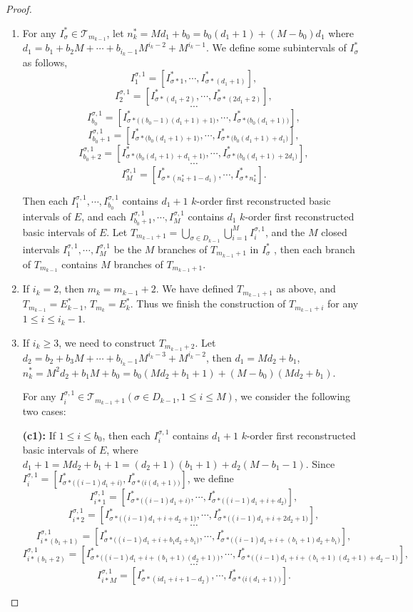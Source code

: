 \documentclass[reqno]{amsart}
\theoremstyle{plain}
\theoremstyle{definition}
\theoremstyle{remark}
\numberwithin{equation}{section} \DeclareMathOperator\intr{int}
\begin{document}
\begin{proof}
\begin{enumerate}
\begin{enumerate}
\item[\textup{(a)}] For any $I_{\sigma}^{*}\in \mathcal{T}_{m_{k-1}}$,
let $n^*_k=Md_1+b_0=b_0(d_1+1)+(M-b_0)d_1$ where
$d_{1}=b_{1}+b_{2}M+\cdots+b_{i_{k}-1}M^{i_{k}-2}+M^{i_{k}-1}$.
We define some subintervals of $I_{\sigma}^{*}$ as follows,
$$I_{1}^{\sigma,1}=[I^*_{\sigma*1},\cdots,I^*_{\sigma*(d_1+1)}],$$
$$I_{2}^{\sigma,1}=[I^*_{\sigma*(d_1+2)},\cdots,I^*_{\sigma*(2d_1+2)}],$$
$$\cdots$$
$$I_{b_0}^{\sigma,1}=[I^*_{\sigma*\big((b_0-1)(d_1+1)+1\big)} ,\cdots,I^*_{\sigma*\big(b_0(d_1+1)\big)}],$$
$$I_{b_0+1}^{\sigma,1}=[I^*_{\sigma*\big(b_0(d_1+1)+1\big)},\cdots,I^*_{\sigma*\big(b_0(d_1+1)+d_1\big)}],$$
$$I_{b_0+2}^{\sigma,1}=[I^*_{\sigma*\big(b_0(d_1+1)+d_1+1\big)},\cdots,I^*_{\sigma*\big(b_0(d_1+1)+2d_1\big)}],$$
$$\cdots$$
$$I_{M}^{\sigma,1}=[I^*_{\sigma*(n^*_k+1-d_1)},\cdots,I^*_{\sigma*n^*_k}].$$

Then each $I_{1}^{\sigma,1}, \cdots, I_{b_0}^{\sigma,1}$ contains $d_1+1$   $k$-order first reconstructed basic intervals of $E$,
and each $I_{b_0+1}^{\sigma,1}, \cdots, I_{M}^{\sigma,1}$ contains $d_1$  $k$-order first reconstructed basic intervals of $E$.
Let $T_{m_{k-1}+1}=\bigcup_{\sigma \in D_{k-1}}\bigcup_{i=1}^{M}I^{\sigma,1}_i$, and the $M$ closed intervals $I_{1}^{\sigma,1},\cdots,I_{M}^{\sigma,1}$ be the $M$ branches of $T_{m_{k-1}+1}$ in $I_{\sigma}^{*}$ , then each branch of $T_{m_{k-1}}$ contains $M$ branches of $T_{m_{k-1}+1}$.


\item[\textup{(b)}] If $i_{k}=2$, then $m_{k}=m_{k-1}+2$. We have defined $T_{m_{k-1}+1}$ as above, and $T_{m_{k-1}}=E_{k-1}^{*}$, $T_{m_{k}}=E_{k}^{*}$.
    Thus we finish the construction of $T_{m_{k-1}+i}$  for any $1\le i\le i_k-1$.

\item[\textup{(c)}] If $i_{k}\ge3$, we need to construct  $T_{m_{k-1}+2}$. Let $d_2=b_2+b_3M+\cdots +b_{i_k-1}M^{i_k-3}+M^{i_k-2}$, then $d_{1}=Md_{2}+b_{1}$, $n^*_k=M^2d_2+b_1M+b_0=b_0(Md_2+b_1+1)+(M-b_0)(Md_2+b_1)$.

For any $I^{\sigma,1}_{i}\in \mathcal{T}_{m_{k-1}+1}(\sigma\in D_{k-1}, 1\le i\le M)$, we consider the following two cases:

\textbf{(c1):} If $1\le i\le b_{0}$,
then each $I^{\sigma,1}_{i}$ contains $d_1+1$  $k$-order first reconstructed basic intervals of $E$,
where $d_1+1=Md_2+b_1+1=(d_2+1)(b_1+1)+d_2(M-b_1-1)$.
Since $I_{i}^{\sigma,1}=[I^*_{\sigma*\big((i-1)d_1+i\big)}, I^*_{\sigma*\big(i(d_1+1)\big)}]$,  we define
$$I_{i*1}^{\sigma,1}=[I^*_{\sigma*\big((i-1)d_1+i\big)},\cdots,I^*_{\sigma*\big((i-1)d_1+i+d_2\big)}],$$
$$I_{i*2}^{\sigma,1}=[I^*_{\sigma*\big((i-1)d_1+i+d_2+1\big)},\cdots,I^*_{\sigma*\big((i-1)d_1+i+2d_2+1\big)}],$$
$$\cdots$$
$$I_{i*(b_1+1)}^{\sigma,1}=[I^*_{\sigma*\big((i-1)d_1+i+b_1d_2+b_1\big)},\cdots,I^*_{\sigma*\big((i-1)d_1+i+(b_1+1)d_2+b_1\big)}],$$
$$I_{i*(b_1+2)}^{\sigma,1}=[I^*_{\sigma*\big((i-1)d_1+i+(b_1+1)(d_2+1)\big)},\cdots,I^*_{\sigma*\big((i-1)d_1+i+(b_1+1)(d_2+1)+d_2-1\big)}],$$
$$\cdots$$
$$I_{i*M}^{\sigma,1}=[I^*_{\sigma*(id_1+i+1-d_2)},\cdots,I^*_{\sigma*\big(i(d_1+1)\big)}].$$


\end{enumerate}
\end{enumerate}
\end{proof}
\end{document}
